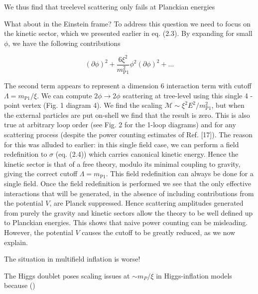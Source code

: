 We thus find that treelevel scattering only fails at Planckian energies


What about in the Einstein frame? To address this question we need to focus on the kinetic sector, which we presented earlier in eq. (2.3). By expanding for small $\phi$, we have the following contributions

$$
(\partial \phi)^2+\frac{6 \xi^2}{m_{\mathrm{P} 1}^2} \phi^2(\partial \phi)^2+\ldots
$$


The second term appears to represent a dimension 6 interaction term with cutoff $\Lambda=m_{\mathrm{P} 1} / \xi$. We can compute $2 \phi \rightarrow 2 \phi$ scattering at tree-level using this single 4 -point vertex (Fig. 1 diagram 4). We find the scaling $\mathcal{M} \sim \xi^2 E^2 / m_{\mathrm{P} 1}^2$, but when the external particles are put on-shell we find that the result is zero. This is also true at arbitrary loop order (see Fig. 2 for the 1-loop diagrams) and for any scattering process (despite the power counting estimates of Ref. [17]). The reason for this was alluded to earlier: in this single field case, we can perform a field redefinition to $\sigma$ (eq. (2.4)) which carries canonical kinetic energy. Hence the kinetic sector is that of a free theory, modulo its minimal coupling to gravity, giving the correct cutoff $\Lambda=m_{\mathrm{P} 1}$. This field redefinition can always be done for a single field. Once the field redefinition is performed we see that the only effective interactions that will be generated, in the absence of including contributions from the potential $V$, are Planck suppressed. Hence scattering amplitudes generated from purely the gravity and kinetic sectors allow the theory to be well defined up to Planckian energies. This shows that naive power counting can be misleading. However, the potential $V$ causes the cutoff to be greatly reduced, as we now explain.


The situation in multifield inflation is worse! 

The Higgs doublet poses scaling issues at $\sim m_P/\xi$ in Higgs-inflation models because ()


